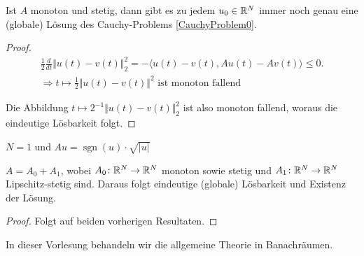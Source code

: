 \begin{lemma}
	Ist $A$ monoton und stetig, dann gibt es zu jedem $u_0\in\mathbb{R}^N$ immer noch genau eine (globale) Lösung des Cauchy-Problems \eqref{CauchyProblem0}.
\end{lemma}

\begin{proof}
	\begin{align*}
		\frac{1}{2}\frac{d}{dt}\Vert u(t)-v(t)\Vert_2^2=-\langle u(t)-v(t),Au(t)-Av(t)\rangle\leq 0.\\
		\Longrightarrow t\mapsto\frac{1}{2}\Vert u(t)-v(t)\Vert^2\text{ ist monoton fallend}
	\end{align*}

	Die Abbildung $t\mapsto 2^{-1}\Vert u(t)-v(t)\Vert_2^2$ ist also monoton fallend, woraus die eindeutige Lösbarkeit folgt. 
\end{proof}

\begin{beispiel}
	$N=1$ und $Au=\operatorname{sgn}(u)\cdot\sqrt{\vert u\vert}$
\end{beispiel}

\begin{korollar}
	$A=A_0+A_1$, wobei $A_0\colon\mathbb{R}^N\to\mathbb{R}^N$ monoton sowie stetig und $A_1\colon\mathbb{R}^N\to\mathbb{R}^N$ Lipschitz-stetig sind. 
	Daraus folgt eindeutige (globale) Lösbarkeit und Existenz der Lösung.
\end{korollar}

\begin{proof}
	Folgt auf beiden vorherigen Resultaten.
\end{proof}

In dieser Vorlesung behandeln wir die allgemeine Theorie in Banachräumen.